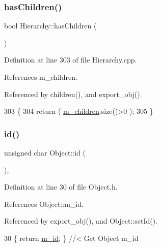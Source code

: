 \subsubsection{\texorpdfstring{has\+Children()}{hasChildren()}}
{\footnotesize\ttfamily bool Hierarchy\+::has\+Children (\begin{DoxyParamCaption}{ }\end{DoxyParamCaption})}



Definition at line 303 of file Hierarchy.\+cpp.



References m\+\_\+children.



Referenced by children(), and export\+\_\+obj().


\begin{DoxyCode}
303                               \{
304   \textcolor{keywordflow}{return} ( \hyperlink{classHierarchy_a038816763941fd4a930504917f60483b}{m\_children}.size()>0 );
305 \}
\end{DoxyCode}
\mbox{\label{classObject_af99145335cc61ff6e2798ea17db009d2}} 
\subsubsection{\texorpdfstring{id()}{id()}}
{\footnotesize\ttfamily unsigned char Object\+::id (\begin{DoxyParamCaption}{ }\end{DoxyParamCaption})\hspace{0.3cm}{\ttfamily [inline]}, {\ttfamily [inherited]}}



Definition at line 30 of file Object.\+h.



References Object\+::m\+\_\+id.



Referenced by export\+\_\+obj(), and Object\+::set\+Id().


\begin{DoxyCode}
30 \{ \textcolor{keywordflow}{return} \hyperlink{classObject_aca74b9dbfed7b5556ea2d56c65b6b6b0}{m\_id};         \} \textcolor{comment}{//< Get Object m\_id }
\end{DoxyCode}
\mbox{\label{classObject_a644fd329ea4cb85f54fa6846484b84a8}} 

